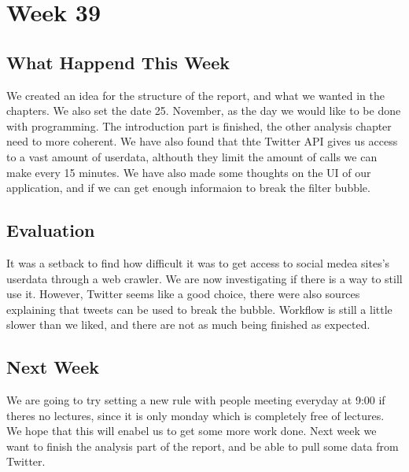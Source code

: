 \section*{Week 39}
\subsection*{What Happend This Week}
We created an idea for the structure of the report, and what we wanted in the
chapters. We also set the date 25. November, as the day we would like
to be done with programming. The introduction part is finished, the other
analysis chapter need to more coherent. We have also found that thte Twitter API
gives us access to a vast amount of userdata, althouth they limit the amount of
calls we can make every 15 minutes. We have also made some thoughts on the UI of
our application, and if we can get enough informaion to break the filter
bubble.

\subsection*{Evaluation}
It was a setback to find how difficult it was to get access to social medea
sites's userdata through a web crawler. We are now investigating if there is a
way to still use it. However, Twitter seems like a good choice, there were
also sources explaining that tweets can be used to break the bubble.
Workflow is still a little slower than we liked, and there are not as much being
finished as expected.

\subsection*{Next Week}
We are going to try setting a new rule with people meeting everyday at 9:00 if
theres no lectures, since it is only monday which is completely free of
lectures. We hope that this will enabel us to get some more work done.
Next week we want to finish the analysis part of the report, and be able to pull
some data from Twitter.
